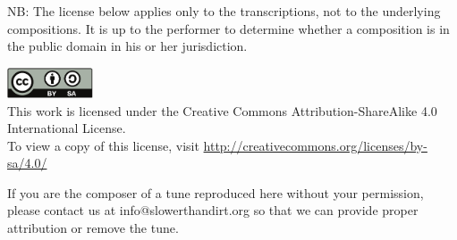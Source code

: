 \begin{titlepage}
\begin{center}
\begin{minipage}{6in}
NB: The license below applies only to the transcriptions, not to the
underlying compositions. It is up to the performer to determine
whether a composition is in the public domain in his or her
jurisdiction.

\end{minipage}

\vfill


\includegraphics[width=1in]{../includes/cc-by-sa}\\
This work is licensed under the Creative Commons
Attribution-ShareAlike 4.0 International License.\\
To view a copy of this license, visit 
\url{http://creativecommons.org/licenses/by-sa/4.0/}

\end{center}
\end{titlepage}

\clearpage



\vfill

\noindent
If you are the composer of a tune reproduced here without your permission,
please contact us at info@slowerthandirt.org so that we can provide proper
attribution or remove the tune.

\cleardoublepage
